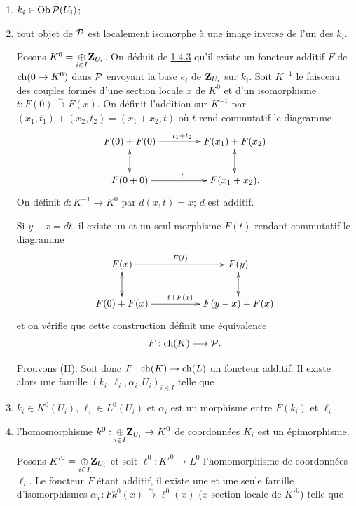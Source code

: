 \documentclass[10pt]{../fichiers-configuration-latex/smfart}
\begin{document}
\begin{enumerate}
\renewcommand{\theenumi}{\alph{enumi}}
\renewcommand{\labelenumi}{(\theenumi)}
\item $k_{i}\in \operatorname{Ob} {\mathcal P}(U_{i})$;

\item tout objet de ${\mathcal P}$ est localement isomorphe à une image
inverse de l'un des $k_{i}$.

Posons $K^{0}=\displaystyle{\mathop{\oplus}_{i\in
I}}\mathbf{Z}_{U_{i}}$. On déduit de \hyperref[XVIII.lem1.4.3]{1.4.3} qu'il existe un foncteur
additif $F$ de $\operatorname{ch}(0\rightarrow K^{0})$ dans ${\mathcal P}$ envoyant
la base $e_{i}$ de $\mathbf{Z}_{U_{i}}$ sur $k_{i}$. Soit $K^{-1}$ le
faisceau des couples formés d'une section locale $x$ de $K^{0}$ et
d'un isomorphisme $t:F(0)\xrightarrow{\sim} F(x)$. On définit
l'addition sur $K^{-1}$ par $(x_{1},
t_{1})+(x_{2},t_{2})=(x_{1}+x_{2},t)$ où $t$ rend commutatif le
diagramme
$$
\xymatrix@C=1.5cm{
F(0) + F(0)    \ar[r]^{t_1+t_2} \ar@{<->}[d]   & F(x_1) + F(x_2)\ar@{<->}[d]\\
F(0+0)          \ar[r]^{t}         & F(x_1+x_2).
}
$$
On définit $d:K^{-1}\rightarrow K^{0}$ par $d(x,t)=x$; $d$ est
additif.

Si $y-x=dt$, il existe un et un seul morphisme $F(t)$ rendant
commutatif le diagramme
$$
\xymatrix@C=1.75cm{
F(x)           \ar[r]^{F(t)}   \ar@{<->}[d]& F(y) \ar@{<->}[d]\\
F(0)+F(x)      \ar[r]^{t+F(x)} & F(y-x)+F(x)
}
$$
et on vérifie que cette construction définit une équivalence
$$
F:\operatorname{ch}(K)\longrightarrow {\mathcal P}{}.
$$

Prouvons (II). Soit donc $F:\operatorname{ch}(K)\rightarrow \operatorname{ch}(L)$ un foncteur
additif. Il existe alors une famille $(k_{i},\ell_{i}, \alpha_{i},
U_{i})_{i\in I}$ telle que

\item $k_{i}\in K^{0}(U_{i})$, $\ell_{i}\in L^{0}(U_{i})$ et
$\alpha_{i}$ est un morphisme entre $F(k_{i})$ et $\ell_{i}$

\item l'homomorphisme $k^{0}:\displaystyle{\mathop{\oplus}_{i\in
I}}\mathbf{Z}_{U_{i}}\rightarrow K^{0}$ de coordonnées $K_{i}$ est un
épimorphisme.

Posons ${K'}^{0}=\displaystyle{\mathop{\oplus}_{i\in
I}}\mathbf{Z}_{U_{i}}$ et soit $\ell^{0}:{K'}^{0}\rightarrow L^{0}$
l'homomorphisme de coordonnées $\ell_{i}$. Le foncteur $F$ étant
additif, il existe une et une seule famille d'isomorphismes
$\alpha_{x}:Fk^{0}(x)\xrightarrow{\sim}\ell^{0}(x)$ ($x$ section
locale de ${K'}^{0}$) telle que


\end{enumerate}
\end{document}
